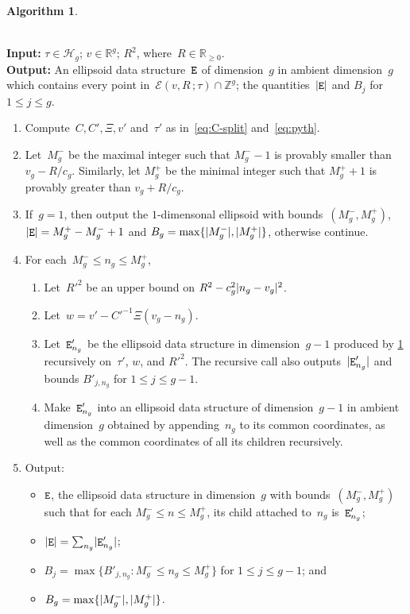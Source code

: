 \documentclass[12pt,oneside]{amsart}
\numberwithin{equation}{section}
\theoremstyle{definition}
\newtheorem{algorithm}[equation]{Algorithm}
\newcommand{\algoinput}[1]{~\\ \noindent\textbf{Input:} #1}
\newcommand{\algooutput}[1]{~\\ \noindent\textbf{Output:} #1}
\newcommand{\Z}{\mathbb{Z}}
\newcommand{\R}{\mathbb{R}}
\newcommand{\Half}{\mathcal{H}}
\newcommand{\eld}[3]{\ensuremath{\mathcal{E}(#1, #2\,; #3)}}
\DeclareMathOperator{\E}{\tt E}
\DeclarePairedDelimiter{\abs}{|}{|}
\begin{document}
\begin{algorithm}
  \label{algo:ellipsoid}

  \algoinput{$\tau\in \Half_g$; $v\in \R^g$; $R^2$, where~$R\in \R_{\geq 0}$.}
  \algooutput{An ellipsoid data structure~$\E$ of dimension~$g$ in ambient
    dimension~$g$ which contains every point in~$\eld{v}{R}{\tau}\cap\Z^g$; the
    quantities~$\abs{\E}$ and $B_j$ for $1\leq j\leq g$.}

  \begin{enumerate}
  \item \label{step:eld-v} Compute~$C, C', \Xi, v'$ and~$\tau'$ as in~\eqref{eq:C-split} and~\eqref{eq:pyth}.
  \item \label{step:eld-bounds} Let~$M_g^-$ be the maximal integer such that
    $M_g^- - 1$ is provably smaller than $v_g-R/c_g$. Similarly, let $M_g^+$ be
    the minimal integer such that $M_g^++1$ is provably greater than
    $v_g + R/c_g$.
  \item If~$g = 1$, then output the $1$-dimensonal ellipsoid with
    bounds~$(M_g^-, M_g^+)$, $\abs{\E} = M_g^+ - M_g^- + 1$ and
    $B_g = \max\{\abs{M_g^-}, \abs{M_g^+}\}$, otherwise continue.
  \item \label{step:eld-rec} For each~$M_g^- \leq n_g \leq M_g^+$,
    \begin{enumerate}
    \item Let~$R'^2$ be an upper bound on $R^2 - c_g^2 \abs{n_g - v_g}^2$.
    \item Let~$w = v' - C'^{-1}\Xi(v_g - n_g)$.
    \item Let~$\E'_{n_g}$ be the ellipsoid data structure in dimension~$g-1$
      produced by \cref{algo:ellipsoid} recursively on~$\tau'$, $w$, and
      $R'^2$. The recursive call also outputs~$\abs{\E'_{n_g}}$ and bounds
      $B'_{j,n_g}$ for $1\leq j\leq g-1$.
    \item Make~$\E'_{n_g}$ into an ellipsoid data structure of dimension~$g-1$
      in ambient dimension~$g$ obtained by appending~$n_g$ to its common
      coordinates, as well as the common coordinates of all its children
      recursively.
    \end{enumerate}
  \item Output:
    \begin{itemize}
    \item $\E$, the ellipsoid data structure in dimension~$g$ with
      bounds~$(M_g^-, M_g^+)$ such that for each $M_g^-\leq n\leq M_g^+$, its
      child attached to~$n_g$ is~$\E'_{n_g}$;
    \item $\abs{\E} = \sum_{n_g} \abs{\E'_{n_g}}$;
    \item $B_j = \max \{B'_{j, n_g}: M_g^-\leq n_g\leq M_g^+\}$ for
      $1\leq j\leq g-1$; and
    \item $B_g = \max\{\abs{M_g^-}, \abs{M_g^+}\}$.
    \end{itemize}
  \end{enumerate}
\end{algorithm}
\end{document}
